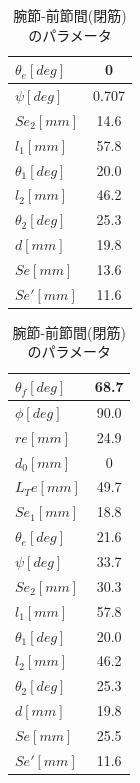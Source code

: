 \begin{table}[htbp]
\begin{minipage}{0.5\hsize}
\begin{tabular}{|l|c|}
    $\theta_e[deg] $ & 0                            \\ \hline
    $\psi[deg]     $ & 0.707                        \\ \hline
    $Se_2[mm]      $ & 14.6                         \\ \hline
    $l_1[mm]       $ & 57.8                         \\ \hline
    $\theta_1[deg] $ & 20.0                         \\ \hline
    $l_2[mm]       $ & 46.2                         \\ \hline
    $\theta_2[deg] $ & 25.3                         \\ \hline
    $d[mm]         $ & 19.8                         \\ \hline
    $Se[mm]        $ & 13.6                         \\ \hline
    $Se'[mm]       $ & 11.6                         \\ \hline
    \end{tabular}
  \end{minipage}
  \begin{minipage}{0.5\hsize}
    \centering
    \vspace{5mm}
    \caption{腕節-前節間(閉筋)のパラメータ}
    \label{tab:parameta_2_2}
    \vspace{-3mm}
    \begin{tabular}{|l|c|}
    \hline
    $\theta _f[deg]$ & 68.7                         \\ \hline
    $\phi[deg]     $ & 90.0                         \\ \hline
    $re[mm]        $ & 24.9                         \\ \hline
    $d_0[mm]       $ & 0                            \\ \hline
    $L_Te[mm]      $ & 49.7                         \\ \hline
    $Se_1[mm]      $ & 18.8                         \\ \hline
    $\theta_e[deg] $ & 21.6                         \\ \hline
    $\psi[deg]     $ & 33.7                         \\ \hline
    $Se_2[mm]      $ & 30.3                         \\ \hline
    $l_1[mm]       $ & 57.8                         \\ \hline
    $\theta_1[deg] $ & 20.0                         \\ \hline
    $l_2[mm]       $ & 46.2                         \\ \hline
    $\theta_2[deg] $ & 25.3                         \\ \hline
    $d[mm]         $ & 19.8                         \\ \hline
    $Se[mm]        $ & 25.5                         \\ \hline
    $Se'[mm]       $ & 11.6                         \\ \hline
    \end{tabular}
  \end{minipage}
\end{table}
